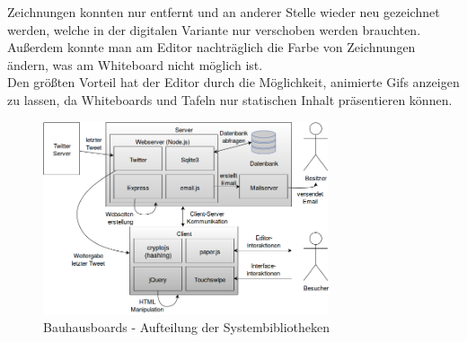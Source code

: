 Zeichnungen konnten nur entfernt und an anderer Stelle wieder neu gezeichnet werden, welche in der digitalen Variante nur verschoben werden brauchten. Außerdem konnte man am Editor nachträglich die Farbe von Zeichnungen ändern, was am Whiteboard nicht möglich ist.
\\
Den größten Vorteil hat der Editor durch die Möglichkeit, animierte Gifs anzeigen zu lassen, da Whiteboards und Tafeln nur statischen Inhalt präsentieren können.
\begin{figure}[h!]
  \centering
    \includegraphics[width=0.75\textwidth]{./img/HighLevelSystemDiagram.png}
  \caption{Bauhausboards - Aufteilung der Systembibliotheken}
  \label{img:highLevelSystemDiagram}
\end{figure}


